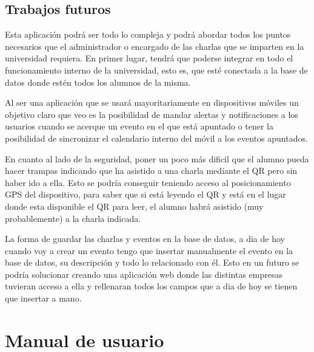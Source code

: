 \documentclass[a4paper, 12pt]{book}
\begin{document}
\section{Trabajos futuros}
\label{sec:trabajos_futuros}

Esta aplicación podrá ser todo lo compleja y podrá abordar todos los puntos necesarios que el administrador o encargado de las charlas que se imparten en la  universidad requiera. 
En primer lugar, tendrá que poderse integrar en todo el funcionamiento interno de la universidad, esto es, que esté conectada a la base de datos  donde estén todos los alumnos de la misma.

Al ser una aplicación que se usará mayoritariamente en dispositivos móviles un objetivo claro que veo es la posibilidad de mandar alertas y notificaciones a los usuarios cuando se acerque un evento en el que está apuntado o tener la posibilidad de sincronizar el calendario interno del móvil a los eventos apuntados.

En cuanto al lado de la seguridad, poner un poco más dificil que el alumno pueda hacer trampas indicando que ha asistido a una charla mediante el QR pero sin haber ido a ella. Esto se podría conseguir teniendo acceso al posicionamiento GPS del dispositivo, para saber que si está leyendo el QR y está en el lugar donde esta disponible el QR para leer, el alumno habrá asistido (muy probablemente) a la charla indicada.


La forma de guardar las charlas y eventos en la base de datos, a dia de hoy cuando voy a crear un evento tengo que insertar manualmente el evento en la base de datos, su descripción y todo lo relacionado con él. Esto en un futuro se podría solucionar creando una aplicación web donde las distintas empresas tuvieran acceso a ella y rellenaran todos los campos que a dia de hoy se tienen que insertar a mano.



\cleardoublepage
\appendix
\chapter{Manual de usuario}
\label{app:manual}
\end{document}

